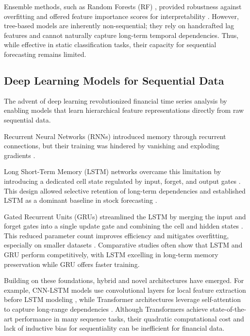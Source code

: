 \documentclass{cys}
\begin{document}
Ensemble methods, such as Random Forests (RF) \cite{breiman2001random}, provided robustness against overfitting and offered feature importance scores for interpretability \cite{kumar2016random}. However, tree-based models are inherently non-sequential; they rely on handcrafted lag features and cannot naturally capture long-term temporal dependencies. Thus, while effective in static classification tasks, their capacity for sequential forecasting remains limited.


\subsection{Deep Learning Models for Sequential Data}
The advent of deep learning revolutionized financial time series analysis by enabling models that learn hierarchical feature representations directly from raw sequential data.

Recurrent Neural Networks (RNNs) introduced memory through recurrent connections, but their training was hindered by vanishing and exploding gradients \cite{bengio1994learning}.

Long Short-Term Memory (LSTM) networks overcame this limitation by introducing a dedicated cell state regulated by input, forget, and output gates \cite{hochreiter1997long}. This design allowed selective retention of long-term dependencies and established LSTM as a dominant baseline in stock forecasting \cite{fischer2018deep, moghar2020stock}.

Gated Recurrent Units (GRUs) streamlined the LSTM by merging the input and forget gates into a single update gate and combining the cell and hidden states \cite{cho2014learning}. This reduced parameter count improves efficiency and mitigates overfitting, especially on smaller datasets \cite{chung2014empirical}. Comparative studies \cite{xiao2024comparative, bhavani2022comparative, nguyen2022accurate} often show that LSTM and GRU perform competitively, with LSTM excelling in long-term memory preservation while GRU offers faster training.

Building on these foundations, hybrid and novel architectures have emerged. For example, CNN-LSTM models use convolutional layers for local feature extraction before LSTM modeling \cite{hoseinzade2019cnn}, while Transformer architectures leverage self-attention to capture long-range dependencies \cite{vaswani2017attention}. Although Transformers achieve state-of-the-art performance in many sequence tasks, their quadratic computational cost and lack of inductive bias for sequentiality can be inefficient for financial data.
\end{document}
